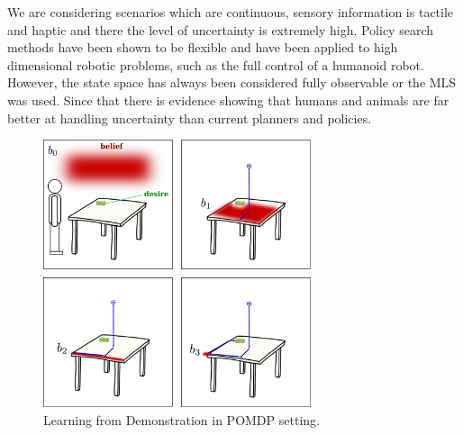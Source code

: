 We are considering scenarios which are continuous, sensory information is tactile and haptic and there the level of uncertainty 
is extremely high. Policy search methods have been shown to be flexible and have been applied to high dimensional robotic problems, such as the full control 
of a humanoid robot. However, the state space has always been considered fully observable or the MLS was used. Since that there is evidence 
showing that humans and animals are far better at handling uncertainty than current planners and policies.

\begin{figure}
 \centering
 \includegraphics[width=0.7\textwidth]{./ch2-Background/Figures/reasoning_uncertainty_concept1.pdf}
 \caption{Learning from Demonstration in POMDP setting.}
\end{figure}










